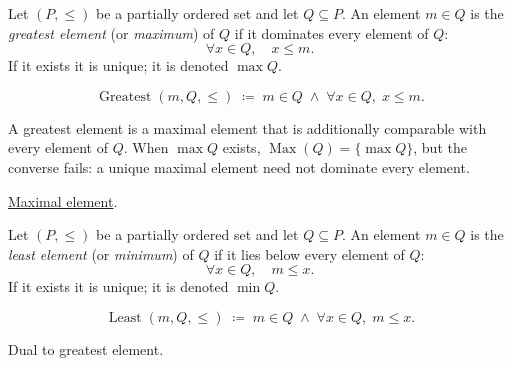 
\begin{definition}
\label{def:greatest-element}
Let $(P, \leq)$ be a partially ordered set and let $Q \subseteq P$.  An
element $m \in Q$ is the \emph{greatest element} (or \emph{maximum}) of
$Q$ if it dominates every element of $Q$:
\[
\forall x \in Q, \quad x \leq m.
\]
If it exists it is unique; it is denoted $\max Q$.
\end{definition}

\begin{remark*}
\[
\operatorname{Greatest}(m, Q, \leq)
\;\coloneqq\;
m \in Q \;\land\; \forall x \in Q,\; x \leq m.
\]
\end{remark*}

\begin{remark*}[Interpretation]
A greatest element is a maximal element that is additionally comparable
with every element of $Q$.  When $\max Q$ exists,
$\operatorname{Max}(Q) = \{\max Q\}$, but the converse fails: a unique
maximal element need not dominate every element.
\end{remark*}

\begin{remark*}[Dependencies]
\hyperref[def:maximal-element]{Maximal element}.
\end{remark*}


\begin{definition}
\label{def:least-element}
Let $(P, \leq)$ be a partially ordered set and let $Q \subseteq P$.  An
element $m \in Q$ is the \emph{least element} (or \emph{minimum}) of $Q$
if it lies below every element of $Q$:
\[
\forall x \in Q, \quad m \leq x.
\]
If it exists it is unique; it is denoted $\min Q$.
\end{definition}

\begin{remark*}
\[
\operatorname{Least}(m, Q, \leq)
\;\coloneqq\;
m \in Q \;\land\; \forall x \in Q,\; m \leq x.
\]
\end{remark*}

\begin{remark*}[Interpretation]
Dual to greatest element.
\end{remark*}

